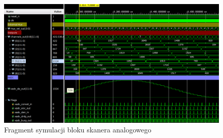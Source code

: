 \vspace{0.5cm}
\begin{figure}[ht]
    \centering
    \includegraphics[width=\textwidth]{img/sim/analog_scanner_sim.png}
    \captionsetup{format=plain,justification=centering}
    \caption{Fragment symulacji bloku skanera analogowego}
    \label{sim-analog-scanner}
\end{figure}
\vspace{0.5cm}
